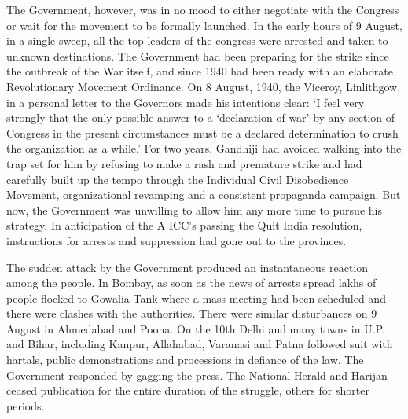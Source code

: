 The Government, however, was in no mood to either negotiate with the Congress or wait for the movement to be formally launched. In the early hours of 9 August, in a single sweep, all the top leaders of the congress were arrested and taken to unknown destinations. The Government had been preparing for the strike since the outbreak of the War itself, and since 1940 had been ready with an elaborate Revolutionary Movement Ordinance. On 8 August, 1940, the Viceroy, Linlithgow, in a personal letter to the Governors made his intentions clear: `I feel very strongly that the only possible answer to a `declaration of war' by any section of Congress in the present circumstances must be a declared determination to crush the organization as a while.' For two years, Gandhiji had avoided walking into the trap set for him by refusing to make a rash and premature strike and had carefully built up the tempo through the Individual Civil Disobedience Movement, organizational revamping and a consistent propaganda campaign. But now, the Government was unwilling to allow him any more time to pursue his strategy. In anticipation of the A ICC's passing the Quit India resolution, instructions for arrests and suppression had gone out to the provinces.

The sudden attack by the Government produced an instantaneous reaction among the people. In Bombay, as soon as the news of arrests spread lakhs of people flocked to Gowalia Tank where a mass meeting had been scheduled and there were clashes with the authorities. There were similar disturbances on 9 August in Ahmedabad and Poona. On the 10th Delhi and many towns in U.P. and Bihar, including Kanpur, Allahabad, Varanasi and Patna followed suit with hartals, public demonstrations and processions in defiance of the law. The Government responded by gagging the press. The National Herald and Harijan ceased publication for the entire duration of the struggle, others for shorter periods.

